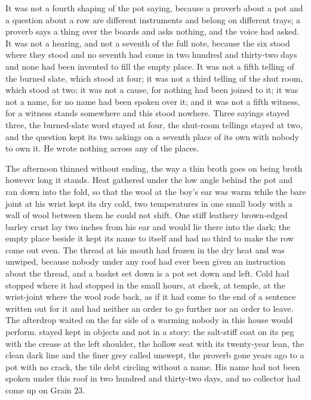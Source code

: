 It was not a fourth shaping of the pot saying, because a proverb about a pot and a question about a row are different instruments and belong on different trays; a proverb says a thing over the boards and asks nothing, and the voice had asked. It was not a hearing, and not a seventh of the full note, because the six stood where they stood and no seventh had come in two hundred and thirty-two days and none had been invented to fill the empty place. It was not a fifth telling of the burned slate, which stood at four; it was not a third telling of the shut room, which stood at two; it was not a cause, for nothing had been joined to it; it was not a name, for no name had been spoken over it; and it was not a fifth witness, for a witness stands somewhere and this stood nowhere. Three sayings stayed three, the burned-slate word stayed at four, the shut-room tellings stayed at two, and the question kept its two askings on a seventh place of its own with nobody to own it. He wrote nothing across any of the places.

\scenebreak

The afternoon thinned without ending, the way a thin broth goes on being broth however long it stands. Heat gathered under the low angle behind the pot and ran down into the fold, so that the wool at the boy's ear was warm while the bare joint at his wrist kept its dry cold, two temperatures in one small body with a wall of wool between them he could not shift. One stiff leathery brown-edged barley crust lay two inches from his ear and would lie there into the dark; the empty place beside it kept its name to itself and had no third to make the row come out even. The thread at his mouth had frozen in the dry heat and was unwiped, because nobody under any roof had ever been given an instruction about the thread, and a basket set down is a pot set down and left. Cold had stopped where it had stopped in the small hours, at cheek, at temple, at the wrist-joint where the wool rode back, as if it had come to the end of a sentence written out for it and had neither an order to go further nor an order to leave. The afterdrop waited on the far side of a warming nobody in this house would perform.  stayed kept in objects and not in a story: the salt-stiff coat on its peg with the crease at the left shoulder, the hollow seat with its twenty-year lean, the clean dark line and the finer grey called  unswept, the proverb gone years ago to a pot with no crack, the tile debt circling without a name. His name had not been spoken under this roof in two hundred and thirty-two days, and no collector had come up  on Grain 23.

